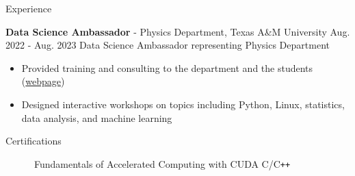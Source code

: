 \documentclass{resume}
\begin{document}
\begin{rSection}{Experience}
    \vspace{1em}
    \item \textbf{Data Science Ambassador} - Physics Department, Texas A\&M University \hfill Aug. 2022 - Aug. 2023
        \newline\hspace*{0.5em} {\normalsize Data Science Ambassador representing Physics Department}
        \begin{itemize}
        \item Provided training and consulting to the department and the students (\href{https://noctildon.github.io/DS_ambassador/index.html}{webpage})
        \item Designed interactive workshops on topics including Python, Linux, statistics, data analysis, and machine learning
        \end{itemize}

\end{rSection}


\begin{rSection}{Certifications}
    \vspace{-1.2em}
    \item ~~~~\textbullet~~Fundamentals of Accelerated Computing with CUDA C/C\texttt{++} \vspace{-0.5em}
    \item \href{https://www.coursera.org/account/accomplishments/verify/N4T4JR8XLU3Z}{\color{black}{~~~~\textbullet~~Machine Learning Foundations: Algorithmic Foundations}} \vspace{-0.5em}
    \item \href{https://www.coursera.org/account/accomplishments/verify/4X4TD24NFAY4}{\color{black}{~~~~\textbullet~~Machine Learning Foundations: Mathematical Foundations}} \vspace{-0.5em}
    \item \href{https://www.coursera.org/account/accomplishments/verify/TJKKSPN42ZEE}{\color{black}{~~~~\textbullet~~Machine Learning Techniques}} \vspace{-0.5em}
    \item \href{https://www.coursera.org/account/accomplishments/verify/KHCRSS4J4TZE}{\color{black}{~~~~\textbullet~~Divide and Conquer, Sorting and Searching, and Randomized Algorithms}} \vspace{-0.5em}
    \item \href{https://www.coursera.org/account/accomplishments/verify/5B7WBDL9BHVF}{\color{black}{~~~~\textbullet~~A Crash Course in Causality: Inferring Causal Effects from Observational Data}}  \vspace{-0.5em}
\end{rSection}
\end{document}
